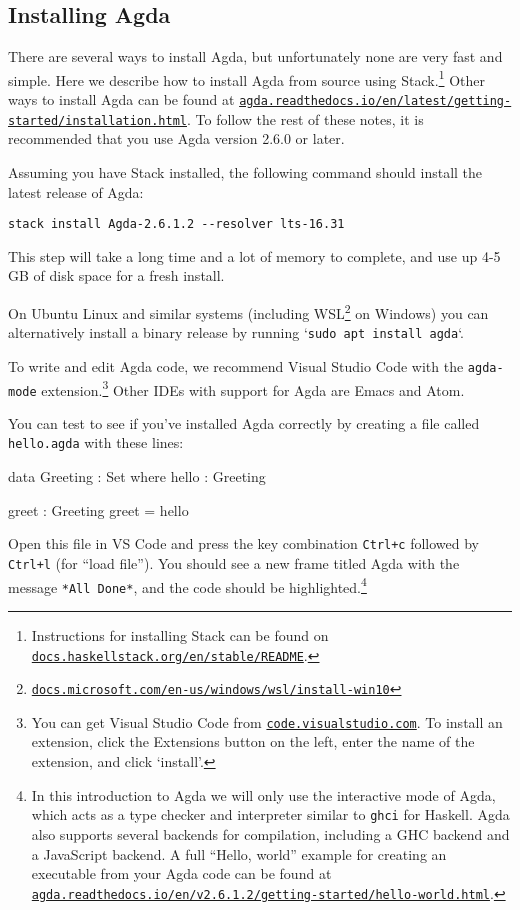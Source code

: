 \documentclass[a4paper,UKenglish]{tufte-handout}
\newcommand{\hrefu}[2]{\href{#1}{\nolinkurl{#2}}}
\theoremstyle{definition}
\begin{document}
\subsection{Installing Agda}

There are several ways to install Agda, but unfortunately none are
very fast and simple. Here we describe how to install Agda from source
using Stack.\footnote{Instructions for installing Stack can be found
on \hrefu{https://docs.haskellstack.org/en/stable/README/}{docs.haskellstack.org/en/stable/README}.} Other ways
to install Agda can be found at
\hrefu{https://agda.readthedocs.io/en/latest/getting-started/installation.html}{agda.readthedocs.io/en/latest/getting-started/installation.html}.
To follow the rest of these notes, it is recommended that you use
Agda version 2.6.0 or later.

Assuming you have Stack installed, the following command should install the
latest release of Agda:
\begin{verbatim}
stack install Agda-2.6.1.2 --resolver lts-16.31
\end{verbatim}
This step will take a long time and a lot of memory to complete, and
use up 4-5 GB of disk space for a fresh install.

On Ubuntu Linux and similar systems (including
WSL\footnote{\hrefu{https://docs.microsoft.com/en-us/windows/wsl/install-win10}{docs.microsoft.com/en-us/windows/wsl/install-win10}}
on Windows) you can alternatively install a binary release by running
`\texttt{sudo apt install agda}`.

To write and edit Agda code, we recommend Visual Studio Code with the
\texttt{agda-mode} extension.\footnote{You can get Visual Studio Code
from \hrefu{https://code.visualstudio.com/}{code.visualstudio.com}. To install an extension,
click the Extensions button on the left, enter the name of the
extension, and click `install'.} Other IDEs with support for Agda are
Emacs and Atom.

You can test to see if you’ve installed Agda correctly by creating a file
called \texttt{hello.agda} with these lines:

\begin{code}[number]
data Greeting : Set where
  hello : Greeting

greet : Greeting
greet = hello
\end{code}
Open this file in VS Code and press the key combination
\texttt{Ctrl+c} followed by \texttt{Ctrl+l} (for ``load file''). You
should see a new frame titled Agda with the message \texttt{*All
Done*}, and the code should be highlighted.\footnote{In this
introduction to Agda we will only use the interactive mode of Agda,
which acts as a type checker and interpreter similar to \texttt{ghci}
for Haskell. Agda also supports several backends for compilation,
including a GHC backend and a JavaScript backend. A full ``Hello,
world'' example for creating an executable from your Agda code can be
found at
\hrefu{https://agda.readthedocs.io/en/v2.6.1.2/getting-started/hello-world.html}{agda.readthedocs.io/en/v2.6.1.2/getting-started/hello-world.html}.}
\end{document}
